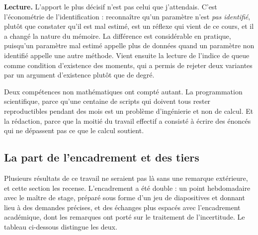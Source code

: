 \documentclass[12pt,a4paper]{article}
\theoremstyle{definition}
\begin{document}
\textbf{Lecture.} L'apport le plus décisif n'est pas celui que j'attendais. C'est
l'économétrie de l'identification : reconnaître qu'un paramètre n'est \emph{pas
identifié}, plutôt que constater qu'il est mal estimé, est un réflexe qui vient de
ce cours, et il a changé la nature du mémoire. La différence est considérable en
pratique, puisqu'un paramètre mal estimé appelle plus de données quand un paramètre
non identifié appelle une autre méthode. Vient ensuite la lecture de l'indice de
queue comme condition d'existence des moments, qui a permis de rejeter deux
variantes par un argument d'existence plutôt que de degré.

Deux compétences non mathématiques ont compté autant. La programmation
scientifique, parce qu'une centaine de scripts qui doivent tous rester
reproductibles pendant des mois est un problème d'ingénierie et non de calcul. Et
la rédaction, parce que la moitié du travail effectif a consisté à écrire des
énoncés qui ne dépassent pas ce que le calcul soutient.

\subsection{La part de l'encadrement et des tiers}
\label{ss:encadrement}

Plusieurs résultats de ce travail ne seraient pas là sans une remarque extérieure,
et cette section les recense. L'encadrement a été double : un point hebdomadaire
avec le maître de stage, préparé sous forme d'un jeu de diapositives et donnant lieu
à des demandes précises, et des échanges plus espacés avec l'encadrement académique,
dont les remarques ont porté sur le traitement de l'incertitude. Le tableau
ci-dessous distingue les deux.
\end{document}
